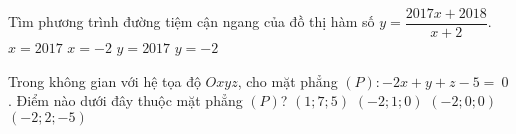 \begin{ex}%
	Tìm phương trình đường tiệm cận ngang của đồ thị hàm số $ y=\dfrac{2017x+2018}{x+2} $.	
	\choice
	{$ x=2017 $}
	{$ x=-2 $}
	{\True $ y=2017 $}
	{$ y=-2 $}
\end{ex}
\begin{ex}%
	Trong không gian với hệ tọa độ $ Oxyz $, cho mặt phẳng $(P)\colon-2x+y+z-5=~0$. Điểm nào dưới đây thuộc mặt phẳng $(P)$?
	\choice
	{$ (1;7;5) $}
	{\True $ (-2;1;0) $}
	{$ (-2;0;0) $}
	{$ (-2;2;-5) $}
\end{ex}

